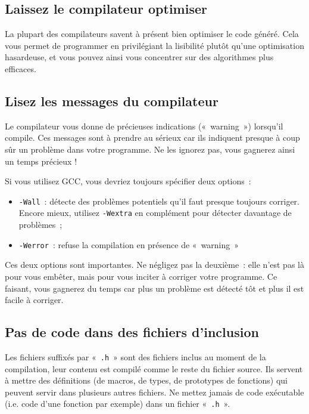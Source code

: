 \documentclass {article}
\begin{document}
\subsection {Laissez le compilateur optimiser}

La plupart des compilateurs savent à présent bien optimiser le code
généré. Cela vous permet de programmer en privilégiant la lisibilité
plutôt qu'une optimisation hasardeuse, et vous pouvez ainsi vous
concentrer sur des algorithmes plus efficaces.


\subsection {Lisez les messages du compilateur}

Le compilateur vous donne de précieuses indications («~warning~»)
lorsqu'il compile. Ces messages sont à prendre au sérieux car ils
indiquent presque à coup sûr un problème dans votre programme. Ne
les ignorez pas, vous gagnerez ainsi un temps précieux !

Si vous utilisez GCC, vous devriez toujours spécifier deux options~:
\begin {itemize}
    \item \texttt {-Wall}~: détecte des problèmes potentiels qu'il
	faut presque toujours corriger. Encore mieux, utilisez
	\texttt {-Wextra} en complément pour détecter davantage
	de problèmes~;
    \item \texttt {-Werror}~: refuse la compilation en présence de
	«~warning~»
\end {itemize}

Ces deux options sont importantes. Ne négligez pas la deuxième~: elle
n'est pas là pour vous embêter, mais pour vous inciter à corriger votre
programme. Ce faisant, vous gagnerez du temps car plus un problème est
détecté tôt et plus il est facile à corriger.

\subsection {Pas de code dans des fichiers d'inclusion}

Les fichiers suffixés par «~\texttt {.h}~» sont des fichiers inclus
au moment de la compilation, leur contenu est compilé comme le reste
du fichier source. Ils servent à mettre des définitions (de macros,
de types, de prototypes de fonctions) qui peuvent servir dans plusieurs
autres fichiers. Ne mettez jamais de code exécutable (i.e. code d'une
fonction par exemple) dans un fichier «~\texttt {.h}~».
\end{document}
